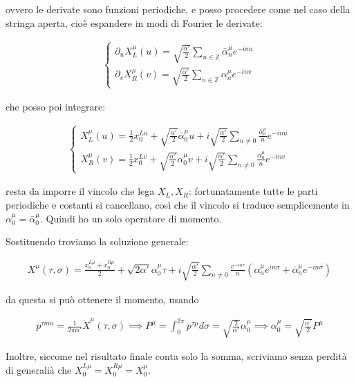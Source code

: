 \documentclass{report}
\begin{document}
ovvero le derivate sono funzioni periodiche, e posso procedere come nel caso della stringa aperta, cioè espandere in modi di Fourier le derivate: 

\begin{align}
    \begin{cases}
        \partial_u X^\mu_L (u) = \sqrt{\frac{\alpha'}{2}}\sum_{n\in \mathbb{Z}}\bar{\alpha}_n^\mu e^{-in u} \\
        \partial_v X^\mu_R (v) = \sqrt{\frac{\alpha'}{2}}\sum_{n\in \mathbb{Z}}\alpha_n^\mu e^{-in v}
    \end{cases}
\end{align}

che posso poi integrare: 

\begin{align}
    \begin{cases}
        X^\mu_L (u) = \frac{1}{2}x_0^{Lu} + \sqrt{\frac{\alpha'}{2}}\bar{\alpha}^\mu_0 u + i\sqrt{\frac{\alpha'}{2}}\sum_{n \neq 0} \frac{\bar{\alpha}_n^\mu}{n}e^{-inu} \\
        X^\mu_R (v) = \frac{1}{2}x_0^{Lv} + \sqrt{\frac{\alpha'}{2}}\alpha^\mu_0 v + i\sqrt{\frac{\alpha'}{2}}\sum_{n \neq 0} \frac{\alpha_n^\mu}{n}e^{-inv}
    \end{cases}
\end{align}

resta da imporre il vincolo che lega \(X_L, X_R\): fortunatamente tutte le parti periodiche e costanti si cancellano, così che il vincolo si traduce semplicemente in \(\alpha_0^\mu = \bar{\alpha}^\mu_0\). Quindi ho un solo operatore di momento. 

Sostituendo troviamo la soluzione generale: 

\begin{align}
    X^\mu(\tau, \sigma) = \frac{x_0^{L\mu} + x_0^{R\mu}}{2} + \sqrt{2\alpha'}\alpha^\mu_0 \tau + i \sqrt{\frac{\alpha'}{2}}\sum_{n\neq 0}\frac{e^{-in\tau}}{n}(\alpha^\mu_n e^{in\sigma} + \bar{\alpha}_n^\mu e^{-in\sigma})
\end{align}

da questa si può ottenere il momento, usando 

\begin{align}
    p^{\tau mu} = \frac{1}{2\pi\alpha'}\dot{X}^\mu (\tau, \sigma) \implies P^\mu = \int_0^{2\pi} p^{\tau \mu}d\sigma = \sqrt{\frac{2}{\alpha'}}\alpha^\mu_0 \implies \alpha^\mu_0 = \sqrt{\frac{\alpha'}{2}}P^\mu
\end{align}

Inoltre, siccome nel risultato finale conta solo la somma, scriviamo senza perdità di generalià che \(X_0^{L\mu} = X_0^{R\mu} = X_0^\mu\). 
\end{document}
